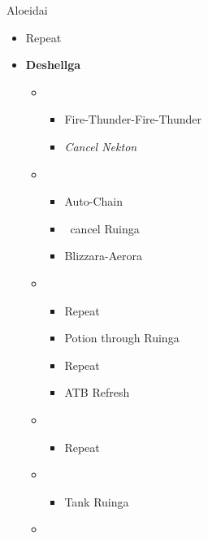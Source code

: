 \begin{battle}{Aloeidai}
\begin{flushleft}
\begin{itemize}
\begin{itemize}
                    \begin{itemize}
                      \item Repeat
                    \end{itemize}
            \end{itemize}
    \end{itemize}
    \begin{itemize}
      \item \textbf{Deshellga}
            \begin{itemize}
              \item \third
                    \begin{itemize}
                      \item Fire-Thunder-Fire-Thunder
                      \item \textit{Cancel Nekton}
                    \end{itemize}
              \item \fifth
                    \begin{itemize}
                      \item Auto-Chain
                      \item \stagger\ cancel Ruinga
                      \item Blizzara-Aerora
                    \end{itemize}
              \item \sixth
                    \begin{itemize}
                      \item Repeat
                      \item Potion through Ruinga
                      \item Repeat
                      \item ATB Refresh
                    \end{itemize}
              \item \fifth
                    \begin{itemize}
                      \item Repeat
                    \end{itemize}
              \item \fourth
                    \begin{itemize}
                      \item Tank Ruinga
                    \end{itemize}
              \item \second

\end{itemize}
\end{itemize}
\end{flushleft}
\end{battle}
